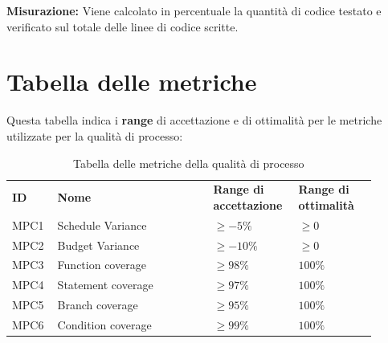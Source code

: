 \documentclass[PianoDiQualifica.tex]{subfiles}
\begin{document}
\textbf{Misurazione:}
Viene calcolato in percentuale la quantità di codice testato e verificato sul totale delle linee di codice scritte.



\section{Tabella delle metriche}
Questa tabella indica i \textbf{range} di accettazione e di ottimalità per le metriche utilizzate per la qualità di processo:
\begin{table}[H]
	\begin{center}
		\begin{tabu} to 
			\tableHeaderStyle
			\textbf{ID} & \textbf{Nome} & \textbf{Range di accettazione} & \textbf{Range di ottimalità}\\

			MPC1 & Schedule Variance & $ \geq -5\% $ & $ \geq 0 $ \\
			MPC2 & Budget Variance & $ \geq -10\% $ & $ \geq 0 $ \\
			MPC3 & Function coverage & $ \geq 98\% $ & $ 100\% $\\
			MPC4 & Statement coverage &  $ \geq 97\% $& $ 100\% $\\
			MPC5 & Branch coverage & $ \geq 95\% $ & $ 100\% $\\
			MPC6 & Condition coverage & $ \geq 99\% $ & $ 100\% $

		\end{tabu}
		\caption{Tabella delle metriche della qualità di processo}
		\vspace{-1em}
	\end{center}
\end{table}
\end{document}
